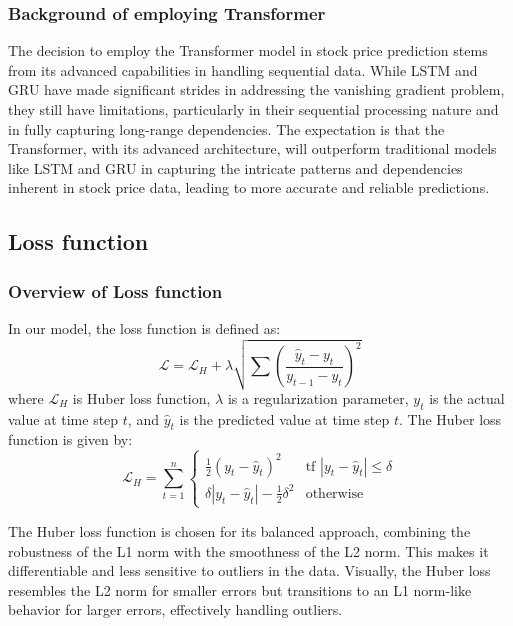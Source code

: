 \subsubsection{Background of employing Transformer}

The decision to employ the Transformer model in stock price prediction stems from its advanced capabilities in handling sequential data. While LSTM and GRU have made significant strides in addressing the vanishing gradient problem, they still have limitations, particularly in their sequential processing nature and in fully capturing long-range dependencies.
The expectation is that the Transformer, with its advanced architecture, will outperform traditional models like LSTM and GRU in capturing the intricate patterns and dependencies inherent in stock price data, leading to more accurate and reliable predictions.

\subsection{Loss function}

\subsubsection{Overview of Loss function}
In our model, the loss function is defined as:
\begin{equation}
	\mathcal{L} = \mathcal{L}_{H} + \lambda \sqrt{\sum \left( \frac{\hat{y}_{t} - {y}_{t}}{{y}_{t-1} - {y}_{t}} \right)^{2}}
\end{equation}
where $\mathcal{L}_{H}$ is Huber loss function, $\lambda$ is a regularization parameter, $y_{t}$ is the actual value at time step $t$, and $\hat{y}_{t}$ is the predicted value at time step $t$.
The Huber loss function is given by:
\begin{equation}
	\label{eq:huber_loss}
	\mathcal{L}_{H} = \sum_{t=1}^{n} \begin{cases}
		\frac{1}{2}(y_{t} - \hat{y}_{t})^{2} & \text{tf } |y_{t} - \hat{y}_{t}| \leq \delta \\
		\delta |y_{t} - \hat{y}_{t}| - \frac{1}{2}\delta^{2} & \text{otherwise}
	\end{cases}
\end{equation}

The Huber loss function is chosen for its balanced approach, combining the robustness of the L1 norm with the smoothness of the L2 norm. 
This makes it differentiable and less sensitive to outliers in the data. 
Visually, the Huber loss resembles the L2 norm for smaller errors but transitions to an L1 norm-like behavior for larger errors, effectively handling outliers.

